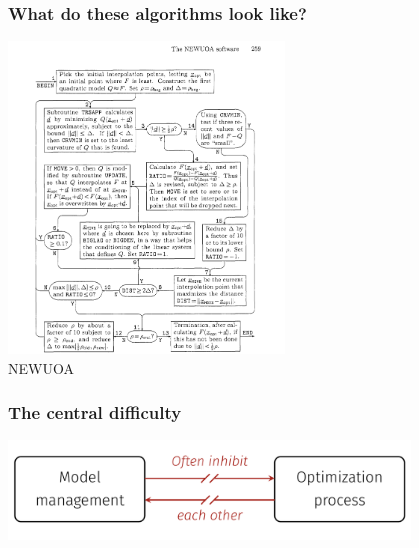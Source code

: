 \documentclass[slidestop,mathserif,xcolor=dvipsnames]{beamer}
\begin{document}
\begin{frame}
    \frametitle{What do these algorithms look like?}
    \vspace{-2ex}
\begin{center}
    \includegraphics[width = 0.55\textwidth]{newuoa_alg.png}
    \\[1ex]NEWUOA
\end{center}
\end{frame}


\begin{frame}
    \frametitle{The central difficulty}
    \vspace{6ex}
    \begin{center}
    \includegraphics[width=0.8\textwidth]{difficulty.png}
    \end{center}
\end{frame}
\end{document}
